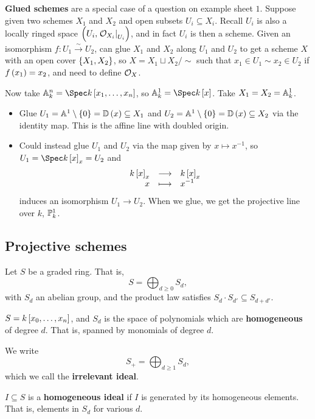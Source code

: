 \textbf{Glued schemes} are a special case of a question on example sheet $ 1 $. Suppose given two schemes $ X_1 $ and $ X_2 $ and open subsets $ U_i \subseteq X_i $. Recall $ U_i $ is also a locally ringed space $ \br{U_i, \eval{\OOO_{X_i}}_{U_i}} $, and in fact $ U_i $ is then a scheme. Given an isomorphism $ f : U_1 \xrightarrow{\sim} U_2 $, can glue $ X_1 $ and $ X_2 $ along $ U_1 $ and $ U_2 $ to get a scheme $ X $ with an open cover $ \cbr{X_1, X_2} $, so $ X = X_1 \sqcup X_2 / \sim $ such that $ x_1 \in U_1 \sim x_2 \in U_2 $ if $ f\br{x_1} = x_2 $, and need to define $ \OOO_X $.

\begin{example*}
Now take $ \AA_k^n = \Spec k\sbr{x_1, \dots, x_n} $, so $ \AA_k^1 = \Spec k\sbr{x} $. Take $ X_1 = X_2 = \AA_k^1 $.
\begin{itemize}
\item Glue $ U_1 = \AA^1 \setminus \cbr{0} = \DD\br{x} \subseteq X_1 $ and $ U_2 = \AA^1 \setminus \cbr{0} = \DD\br{x} \subseteq X_2 $ via the identity map. This is the affine line with doubled origin.
\item Could instead glue $ U_1 $ and $ U_2 $ via the map given by $ x \mapsto x^{-1} $, so $ U_1 = \Spec k\sbr{x}_x = U_2 $ and
$$ \function{k\sbr{x}_x}{k\sbr{x}_x}{x}{x^{-1}} $$
induces an isomorphism $ U_1 \to U_2 $. When we glue, we get the projective line over $ k $, $ \PP_k^1 $.
\end{itemize}
\end{example*}

\subsection{Projective schemes}

Let $ S $ be a graded ring. That is,
$$ S = \bigoplus_{d \ge 0} S_d, $$
with $ S_d $ an abelian group, and the product law satisfies $ S_d \cdot S_{d'} \subseteq S_{d + d'} $.

\begin{example*}
$ S = k\sbr{x_0, \dots, x_n} $, and $ S_d $ is the space of polynomials which are \textbf{homogeneous} of degree $ d $. That is, spanned by monomials of degree $ d $.
\end{example*}

We write
$$ S_+ = \bigoplus_{d \ge 1} S_d, $$
which we call the \textbf{irrelevant ideal}.

\begin{definition*}
$ I \subseteq S $ is a \textbf{homogeneous ideal} if $ I $ is generated by its homogeneous elements. That is, elements in $ S_d $ for various $ d $.
\end{definition*}

